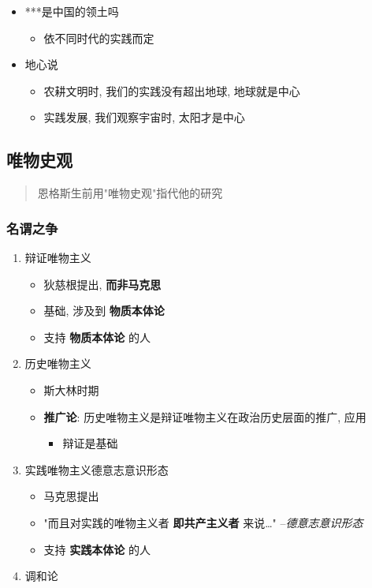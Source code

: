 \documentclass[11pt]{article}
\begin{document}
\begin{enumerate}
\begin{enumerate}
\begin{enumerate}
\begin{itemize}
\begin{itemize}
\end{itemize}
\item ***是中国的领土吗
\begin{itemize}
\item 依不同时代的实践而定
\end{itemize}
\item 地心说
\begin{itemize}
\item 农耕文明时, 我们的实践没有超出地球, 地球就是中心
\item 实践发展, 我们观察宇宙时, 太阳才是中心
\end{itemize}
\end{itemize}
\end{enumerate}
\end{enumerate}
\end{enumerate}
\subsection{唯物史观}
\label{sec:org436d138}
\begin{quote}
恩格斯生前用"唯物史观"指代他的研究
\end{quote}
\subsubsection{名谓之争}
\label{sec:orge29e6bb}
\begin{enumerate}
\item 辩证唯物主义
\label{sec:orgddd768b}
\begin{itemize}
\item 狄慈根提出, \textbf{而非马克思}
\item 基础, 涉及到 \textbf{物质本体论}
\item 支持 \textbf{物质本体论} 的人
\end{itemize}
\item 历史唯物主义
\label{sec:org477b868}
\begin{itemize}
\item 斯大林时期
\item \textbf{推广论}: 历史唯物主义是辩证唯物主义在政治历史层面的推广, 应用
\begin{itemize}
\item 辩证是基础
\end{itemize}
\end{itemize}
\item 实践唯物主义\hfill{}\textsc{德意志意识形态}
\label{sec:orge29cf5f}
\begin{itemize}
\item 马克思提出
\item "而且对实践的唯物主义者 \textbf{即共产主义者} 来说\ldots{}" --\emph{德意志意识形态}
\item 支持 \textbf{实践本体论} 的人
\end{itemize}
\item 调和论
\label{sec:org458d4a9}
\end{enumerate}
\end{document}
